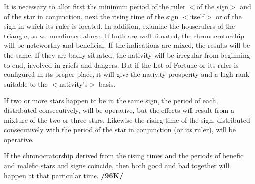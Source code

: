 It is necessary to allot first the minimum period of the ruler $<$of the sign$>$ and of the star in conjunction, next the rising time of the sign $<$itself$>$ or of the sign in which its ruler is located. In addition, examine the houserulers of the triangle, as we mentioned above. If both are well situated, the chronocratorship will be noteworthy and beneficial. If the indications are mixed, the results will be the same. If they are badly situated, the nativity will be irregular from beginning to end, involved in griefs and dangers. But if the Lot of Fortune or its ruler is configured in its proper place, it will give the nativity prosperity and a high rank suitable to the $<$nativity’s$>$ basis. 

If two or more stars happen to be in the same sign, the period of each, distributed consecutively, will be operative, but the effects will result from a mixture of the two or three stars. Likewise the rising time of the sign, distributed consecutively with the period of the star in conjunction (or its ruler), will be operative. 

If the chronocratorship derived from the rising times and the periods of benefic and malefic stars and signs coincide, then both good and bad together will happen at that particular time. \textbf{/96K/}

\newpage